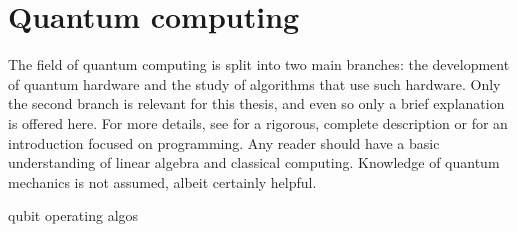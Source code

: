 \chapter{Quantum computing}
\label{chap:qc}
The field of quantum computing is split into two main branches: the development of quantum hardware and the study of algorithms that use such hardware.
Only the second branch is relevant for this thesis, and even so only a brief explanation is offered here.
For more details, see \cite{nielsen2012} for a rigorous, complete description or \cite{qiskit_textbook} for an introduction focused on programming.
Any reader should have a basic understanding of linear algebra and classical computing.
Knowledge of quantum mechanics is not assumed, albeit certainly helpful.

{qubit}
{operating}
{algos}




